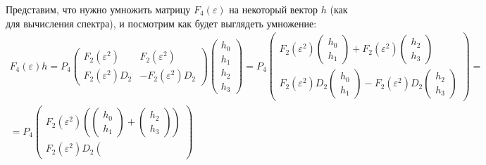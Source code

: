 Представим, что нужно умножить матрицу $F_4(\varepsilon)$ на некоторый вектор $h$ (как для вычисления спектра), и посмотрим как будет выглядеть умножение:
\begin{multline*}
    F_4(\varepsilon) h
    = P_4
    \begin{pmatrix}
        F_2(\varepsilon^2)     & F_2(\varepsilon^2)       \\
        F_2(\varepsilon^2) D_2 & - F_2(\varepsilon^2) D_2
    \end{pmatrix}
    \begin{pmatrix}
        h_0 \\
        h_1 \\
        h_2 \\
        h_3
    \end{pmatrix}
    = P_4
    \begin{pmatrix}
        F_2(\varepsilon^2)
        \begin{pmatrix}
            h_0 \\
            h_1
        \end{pmatrix}
        +
        F_2(\varepsilon^2)
        \begin{pmatrix}
            h_2 \\
            h_3
        \end{pmatrix} \\
        F_2(\varepsilon^2) D_2
        \begin{pmatrix}
            h_0 \\
            h_1
        \end{pmatrix}
        - F_2(\varepsilon^2) D_2
        \begin{pmatrix}
            h_2 \\
            h_3
        \end{pmatrix}
    \end{pmatrix}
    = \\
    = P_4
    \begin{pmatrix}
        F_2(\varepsilon^2)
        \left(
        \begin{pmatrix}
            h_0 \\
            h_1
        \end{pmatrix}
        +
        \begin{pmatrix}
            h_2 \\
            h_3
        \end{pmatrix}
        \right) \\
        F_2(\varepsilon^2) D_2
        \left(

\end{pmatrix}
\end{multline*}

